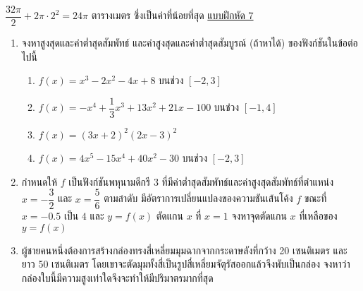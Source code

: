\documentclass[hidelinks,12pt,a4paper]{article}
\newcommand{\s}{\space}
\newcommand{\qed}{\scalebox{0.8}{$\blacksquare$}}
\begin{document}
\hspace{15mm} $\dfrac{32\pi}{2}+2\pi\cdot2^2=24\pi$ ตารางเมตร ซึ่งเป็นค่าที่น้อยที่สุด \hfill\qed
\newpage
\underline{\large แบบฝึกหัด 7} 
\begin{enumerate}
    \item จงหาสูงสุดและค่าต่ำสุดสัมพัทธ์ และค่าสูงสุดและค่าต่ำสุดสัมบูรณ์ (ถ้าหาได้) ของฟังก์ชันในข้อต่อไปนี้
    \begin{enumerate}
        \renewcommand{\labelenumii}{\arabic{enumii})}
        \item $f(x)=x^3-2x^2-4x+8$ \s บนช่วง \s $[-2,3]$
        \vspace{50mm}
        \item $f(x)=-x^4+\dfrac{1}{3}x^3+13x^2+21x-100$ \s บนช่วง \s $[-1,4]$
        \vspace{50mm}
        \item $f(x)=(3x+2)^2(2x-3)^2$
        \vspace{50mm}
        \item $f(x)=4x^5-15x^4+40x^2-30$ \s บนช่วง \s $[-2,3]$
    \end{enumerate}
    \newpage
    \item กำหนดให้ $f$ เป็นฟังก์ชันพหุนามดีกรี $3$ ที่มีค่าต่ำสุดสัมพัทธ์และค่าสูงสุดสัมพัทธ์ที่ตำแหน่ง $x=-\dfrac{3}{2}$ และ $x=\dfrac{5}{6}$ ตามลำดับ \s มีอัตราการเปลี่ยนแปลงของความชันเส้นโค้ง $f$ ขณะที่ $x=-0.5$ เป็น $4$ \s และ $y=f(x)$ ตัดแกน $x$ ที่ $x=1$ \s \s จงหาจุดตัดแกน $x$ ที่เหลือของ $y=f(x)$ 
    \vspace{80mm}
    \item ผู้ชายคนหนึ่งต้องการสร้างกล่องทรงสี่เหลี่ยมมุมฉากจากกระดาษลังที่กว้าง 20 เซนติเมตร และยาว 50 เซนติเมตร โดยเขาจะตัดมุมทั้งสี่เป็นรูปสี่เหลี่ยมจัตุรัสออกแล้วจึงพับเป็นกล่อง จงหาว่ากล่องใบนี้มีความสูงเท่าใดจึงจะทำให้มีปริมาตรมากที่สุด
    \begin{center}
    \end{center}
\end{enumerate}
\end{document}
